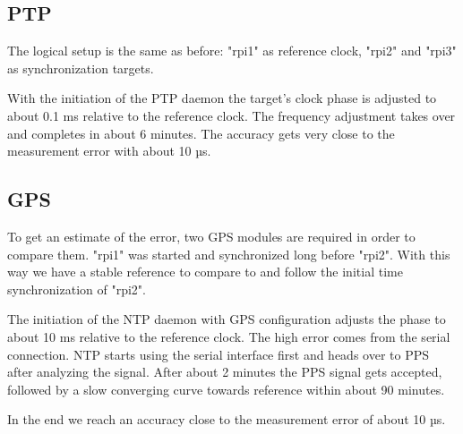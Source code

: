 \subsection{PTP}

The logical setup is the same as before: "rpi1" as reference clock, "rpi2" and "rpi3" as synchronization targets.


With the initiation of the PTP daemon the target’s clock phase is adjusted to about 0.1 ms relative to the reference clock. The frequency adjustment takes over and completes in about 6 minutes. The accuracy gets very close to the measurement error with about 10 µs.


\subsection{GPS}

To get an estimate of the error, two GPS modules are required in order to compare them. "rpi1" was started and synchronized long before "rpi2". With this way we have a stable reference to compare to and follow the initial time synchronization of "rpi2".


The initiation of the NTP daemon with GPS configuration adjusts the phase to about 10 ms relative to the reference clock. The high error comes from the serial connection. NTP starts using the serial interface first and heads over to PPS after analyzing the signal. After about 2 minutes the PPS signal gets accepted, followed by a slow converging curve towards reference within about 90 minutes.


In the end we reach an accuracy close to the measurement error of about 10 µs.


